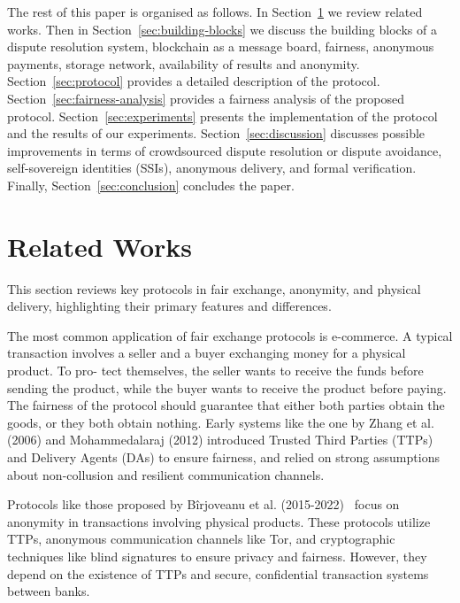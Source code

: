 \documentclass[pdftex,twocolumn,epjc3]{svjour3}
\begin{document}
The rest of this paper is organised as follows.
In Section~\ref{sec:related-works} we review related works. 
Then in Section~\ref{sec:building-blocks} we discuss the building blocks of a dispute resolution system, blockchain as a message board, fairness, anonymous payments, storage network, availability of results and anonymity.
Section~\ref{sec:protocol} provides a detailed description of the protocol.
Section~\ref{sec:fairness-analysis} provides a fairness analysis of the proposed protocol.
Section~\ref{sec:experiments} presents the implementation of the protocol and the results of our experiments.
Section~\ref{sec:discussion} discusses possible improvements in terms of crowdsourced dispute resolution or dispute avoidance, self-sovereign identities (SSIs), anonymous delivery, and formal verification.
Finally, Section~\ref{sec:conclusion} concludes the paper.


\section{Related Works}\label{sec:related-works}
This section reviews key protocols in fair exchange, anonymity, and physical delivery, highlighting their primary features and differences.

The most common application of fair exchange protocols
is e-commerce. A typical transaction involves a seller and
a buyer exchanging money for a physical product. To pro-
tect themselves, the seller wants to receive the funds before
sending the product, while the buyer wants to receive the
product before paying. The fairness of the protocol should
guarantee that either both parties obtain the goods, or they
both obtain nothing.
Early systems like the one by Zhang et al. (2006)\cite{zhangPracticalFairExchangeEPayment2006} and Mohammedalaraj (2012)\cite{mohammedalarajFairnessPhysicalProducts2012} introduced Trusted Third Parties (TTPs) and Delivery Agents (DAs) to ensure fairness, and relied on strong assumptions about non-collusion and resilient communication channels.

Protocols like those proposed by Bîrjoveanu et al. (2015-2022)~\cite{birjoveanuAnonymityFairexchangeEcommerce2015, birjoveanuPreservingAnonymityFair2018, birjoveanuAnonymityComplexTransactions2019, birjoveanuFairExchangeECommerce2020, birjoveanuTwoPartyECommerceProtocols2022} focus on anonymity in transactions involving physical products. These protocols utilize TTPs, anonymous communication channels like Tor, and cryptographic techniques like blind signatures to ensure privacy and fairness. However, they depend on the existence of TTPs and secure, confidential transaction systems between banks.
\end{document}
